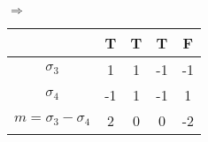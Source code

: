 \documentclass{beamer}
\begin{document}
\begin{frame}
\begin{table}[h!]
\begin{center}
\begin{tabular}{|c|c|c|c|c|}
			\end{tabular}
			\quad
			$\Rightarrow$
			\quad
			\begin{tabular}{|c|c|c|c|c|}
				\hline
				& T & T & T & F \\
				\hline
				\hline
				$\sigma_3$ & 1 & 1 & -1 & -1 \\
				\hline
				$\sigma_4$ & -1 & 1 & -1 & 1 \\
				\hline
				$m=\sigma_3-\sigma_4$ & 2 & 0 & 0 & -2 \\
				\hline
			\end{tabular} 
			
		\end{center}
	\end{table} 
	
\end{frame}
\end{document}
